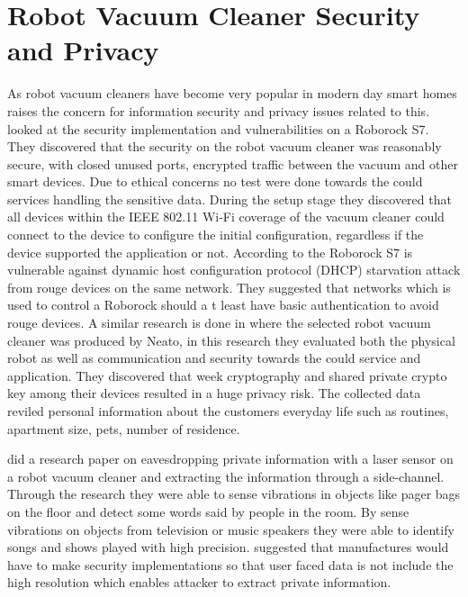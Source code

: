 \section{Robot Vacuum Cleaner Security and Privacy}
As robot vacuum cleaners have become very popular in modern day smart homes raises the concern for information security and privacy issues related to this. \cite{Roborockvulnerability} looked at the security implementation and vulnerabilities on a Roborock S7. They discovered that the security on the robot vacuum cleaner was reasonably secure, with closed unused ports, encrypted traffic between the vacuum and other smart devices. Due to ethical concerns no test were done towards the could services handling the sensitive data. During the setup stage they discovered that all devices within the IEEE 802.11 Wi-Fi coverage of the vacuum cleaner could connect to the device to configure the initial configuration, regardless if the device supported the application or not. According to \cite{Roborockvulnerability} the Roborock S7 is vulnerable against dynamic host configuration protocol (DHCP) \cite{dhcp} starvation attack from rouge devices on the same network. They suggested that networks which is used to control a Roborock should a t least have basic authentication to avoid rouge devices. 
A similar research is done in \cite{Neato} where the selected robot vacuum cleaner was produced by Neato, in this research they evaluated both the physical robot as well as communication and security towards the could service and application. They discovered that week cryptography and shared private crypto key among their devices resulted in a huge privacy risk. The collected data reviled personal information about the customers everyday life such as routines, apartment size, pets, number of residence. 

\cite{lindaeavesdropping} did a research paper on eavesdropping private information with a laser sensor on a robot vacuum cleaner and extracting the information through a side-channel. Through the research they were able to sense vibrations in objects like pager bags on the floor and detect some words said by people in the room. By sense vibrations on objects from television or music speakers they were able to identify songs and shows played with high precision. \cite{lindaeavesdropping} suggested that manufactures would have to make security implementations so that user faced data is not include the high resolution which enables attacker to extract private information.
